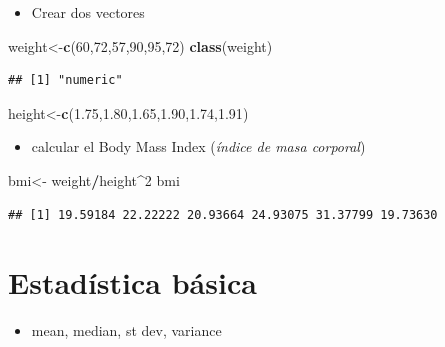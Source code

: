 \documentclass[]{book}
\newenvironment{Shaded}{\begin{snugshade}}{\end{snugshade}}
\newcommand{\KeywordTok}[1]{\textcolor[rgb]{0.13,0.29,0.53}{\textbf{#1}}}
\newcommand{\DecValTok}[1]{\textcolor[rgb]{0.00,0.00,0.81}{#1}}
\newcommand{\FloatTok}[1]{\textcolor[rgb]{0.00,0.00,0.81}{#1}}
\newcommand{\StringTok}[1]{\textcolor[rgb]{0.31,0.60,0.02}{#1}}
\newcommand{\OperatorTok}[1]{\textcolor[rgb]{0.81,0.36,0.00}{\textbf{#1}}}
\newcommand{\NormalTok}[1]{#1}
\providecommand{\tightlist}{%
  \setlength{\itemsep}{0pt}\setlength{\parskip}{0pt}}
\begin{document}
\begin{itemize}
\tightlist
\item
  Crear dos vectores
\end{itemize}

\begin{Shaded}
\begin{Highlighting}[]
\NormalTok{weight<-}\KeywordTok{c}\NormalTok{(}\DecValTok{60}\NormalTok{,}\DecValTok{72}\NormalTok{,}\DecValTok{57}\NormalTok{,}\DecValTok{90}\NormalTok{,}\DecValTok{95}\NormalTok{,}\DecValTok{72}\NormalTok{)  }
\KeywordTok{class}\NormalTok{(weight)}
\end{Highlighting}
\end{Shaded}

\begin{verbatim}
## [1] "numeric"
\end{verbatim}

\begin{Shaded}
\begin{Highlighting}[]
\NormalTok{height<-}\KeywordTok{c}\NormalTok{(}\FloatTok{1.75}\NormalTok{,}\FloatTok{1.80}\NormalTok{,}\FloatTok{1.65}\NormalTok{,}\FloatTok{1.90}\NormalTok{,}\FloatTok{1.74}\NormalTok{,}\FloatTok{1.91}\NormalTok{)}
\end{Highlighting}
\end{Shaded}

\begin{itemize}
\tightlist
\item
  calcular el Body Mass Index (\emph{índice de masa corporal})
\end{itemize}

\begin{Shaded}
\begin{Highlighting}[]
\NormalTok{bmi<-}\StringTok{ }\NormalTok{weight}\OperatorTok{/}\NormalTok{height}\OperatorTok{^}\DecValTok{2}
\NormalTok{bmi}
\end{Highlighting}
\end{Shaded}

\begin{verbatim}
## [1] 19.59184 22.22222 20.93664 24.93075 31.37799 19.73630
\end{verbatim}

\section{Estadística básica}\label{estadistica-basica}

\begin{itemize}
\tightlist
\item
  mean, median, st dev, variance
\end{itemize}
\end{document}
